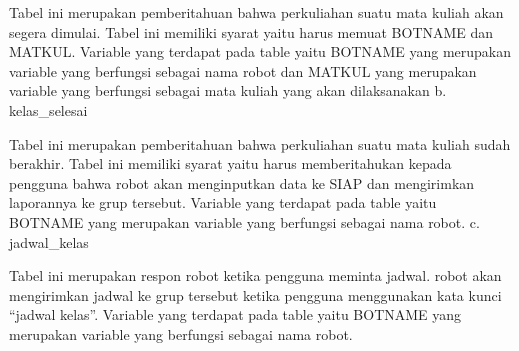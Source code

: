 \documentclass{article}
\newcounter{saveenumi}
\newcommand{\seti}{\setcounter{saveenumi}{\value{enumi}}} %
\begin{document}
\begin{enumerate}
            \par Tabel ini merupakan pemberitahuan bahwa perkuliahan suatu mata kuliah akan segera dimulai. Tabel ini memiliki syarat yaitu harus memuat BOTNAME dan MATKUL. Variable yang terdapat pada table yaitu BOTNAME yang merupakan variable yang berfungsi sebagai nama robot dan MATKUL yang merupakan variable yang berfungsi sebagai mata kuliah yang akan dilaksanakan
            \newline
        	b. kelas\_selesai
            \newline
            \par Tabel ini merupakan pemberitahuan bahwa perkuliahan suatu mata kuliah sudah berakhir. Tabel ini memiliki syarat yaitu harus memberitahukan kepada pengguna bahwa robot akan menginputkan data ke SIAP dan mengirimkan laporannya ke grup tersebut. Variable yang terdapat pada table yaitu BOTNAME yang merupakan variable yang berfungsi sebagai nama robot.
            \newline
        	c. jadwal\_kelas
            \newline
            \par Tabel ini merupakan respon robot ketika pengguna meminta jadwal. robot akan mengirimkan jadwal ke grup tersebut ketika pengguna menggunakan kata kunci “jadwal kelas”. Variable yang terdapat pada table yaitu BOTNAME yang merupakan variable yang berfungsi sebagai nama robot.
            \newline
            \seti %
        \end{enumerate}
\end{document}
